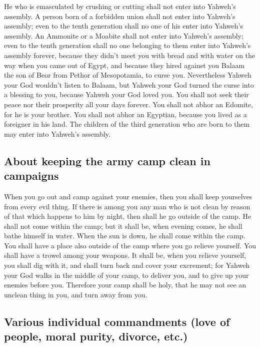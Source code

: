  He who is emasculated by crushing or cutting shall not
enter into Yahweh's assembly.  A person born of a
forbidden union shall not enter into Yahweh's assembly; even to the
tenth generation shall no one of his enter into Yahweh's assembly.
 An Ammonite or a Moabite shall not enter into Yahweh's
assembly; even to the tenth generation shall no one belonging to them
enter into Yahweh's assembly forever,  because they didn't
meet you with bread and with water on the way when you came out of
Egypt, and because they hired against you Balaam the son of Beor from
Pethor of Mesopotamia, to curse you.  Nevertheless Yahweh
your God wouldn't listen to Balaam, but Yahweh your God turned the curse
into a blessing to you, because Yahweh your God loved you.
 You shall not seek their peace nor their prosperity all
your days forever.  You shall not abhor an Edomite, for he
is your brother. You shall not abhor an Egyptian, because you lived as a
foreigner in his land.  The children of the third
generation who are born to them may enter into Yahweh's assembly.

\hypertarget{about-keeping-the-army-camp-clean-in-campaigns}{%
\subsection{About keeping the army camp clean in
campaigns}\label{about-keeping-the-army-camp-clean-in-campaigns}}

 When you go out and camp against your enemies, then you
shall keep yourselves from every evil thing.  If there is
among you any man who is not clean by reason of that which happens to
him by night, then shall he go outside of the camp. He shall not come
within the camp;  but it shall be, when evening comes, he
shall bathe himself in water. When the sun is down, he shall come within
the camp.  You shall have a place also outside of the
camp where you go relieve yourself.  You shall have a
trowel among your weapons. It shall be, when you relieve yourself, you
shall dig with it, and shall turn back and cover your excrement;
 for Yahweh your God walks in the middle of your camp, to
deliver you, and to give up your enemies before you. Therefore your camp
shall be holy, that he may not see an unclean thing in you, and turn
away from you.

\hypertarget{various-individual-commandments-love-of-people-moral-purity-divorce-etc.}{%
\subsection{Various individual commandments (love of people, moral
purity, divorce,
etc.)}\label{various-individual-commandments-love-of-people-moral-purity-divorce-etc.}}

